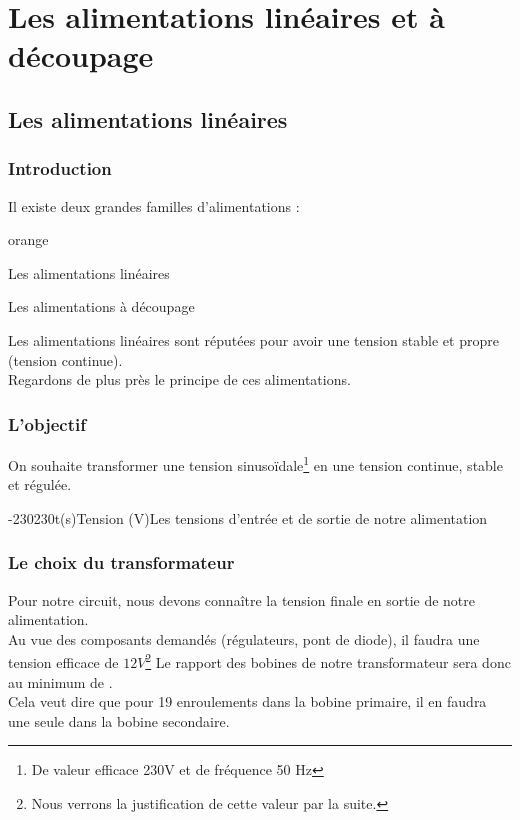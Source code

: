  
\part{Les alimentations linéaires et à découpage}

\chapter{Les alimentations linéaires}
\section{Introduction}

Il existe deux grandes familles d'alimentations : 

\begin{items}{orange}{\Triangle}
    \item Les alimentations linéaires
    \item Les alimentations à découpage 
\end{items}

Les alimentations linéaires sont réputées pour avoir une tension stable et propre (tension continue).\\
Regardons de plus près le principe de ces alimentations.

\section{L'objectif}

On souhaite transformer une tension sinusoïdale\footnote{De valeur efficace 230V et de fréquence 50 Hz} en une tension continue, 
stable et régulée.

\vfill
\begin{graphicFigure}{0.8}{1}{0}{0.08}{-230}{230}{t(s)}{Tension (V)}{Les tensions d'entrée et de sortie de notre alimentation}
  \end{graphicFigure}

  \newpage
  \section{Le choix du transformateur}

  Pour notre circuit, nous devons connaître la tension finale en sortie de notre alimentation.\\
  Au vue des composants demandés (régulateurs, pont de diode), il faudra une tension efficace de $12V$\footnote{Nous verrons 
  la justification de cette valeur par la suite.}
  Le rapport des bobines de notre transformateur sera donc au minimum de . \\Cela veut dire que pour 19 enroulements dans 
  la bobine primaire, il en faudra une seule dans la bobine secondaire.

